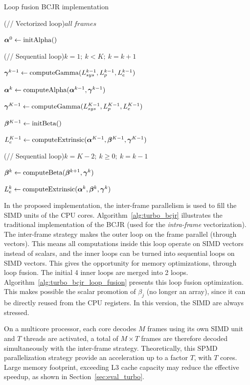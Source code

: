 \begin{algorithm}
  \caption{Loop fusion BCJR implementation}
  \label{alg:turbo_bcjr_loop_fusion}

  \For(// Vectorized loop){$all~frames$}
  {
    $\boldsymbol{\alpha}^0\gets \operatorname*{initAlpha}()$

    \For(// Sequential loop){$k=1;~k<K;~k=k+1$}
    {
      $\boldsymbol{\gamma}^{k-1}\gets \operatorname*{computeGamma}(L_{sys}^{k-1}, L_{p}^{k-1}, L_{e}^{k-1})$

      $\boldsymbol{\alpha}^k\gets \operatorname*{computeAlpha}(\boldsymbol{\alpha}^{k-1}, \boldsymbol{\gamma}^{k-1})$
    }

    $\boldsymbol{\gamma}^{K-1}\gets \operatorname*{computeGamma}(L_{sys}^{K-1}, L_{p}^{K-1}, L_{e}^{K-1})$

    $\boldsymbol{\beta}^{K-1}\gets \operatorname*{initBeta}()$

    $L_e^{K-1}\gets \operatorname*{computeExtrinsic}(\boldsymbol{\alpha}^{K-1}, \boldsymbol{\beta}^{K-1}, \boldsymbol{\gamma}^{K-1})$

    \For(// Sequential loop){$k=K-2;~k \geq 0;~k=k-1$}
    {
      $\boldsymbol{\beta}^k\gets \operatorname*{computeBeta}(\boldsymbol{\beta}^{k+1}, \boldsymbol{\gamma}^{k})$

      $L_e^{k}\gets \operatorname*{computeExtrinsic}(\boldsymbol{\alpha}^{k}, \boldsymbol{\beta}^k, \boldsymbol{\gamma}^{k})$
    }
  }
\end{algorithm}

In the proposed implementation, the inter-frame parallelism is used to fill the
SIMD units of the CPU cores. Algorithm~\ref{alg:turbo_bcjr} illustrates the
traditional implementation of the BCJR (used for the \emph{intra-frame}
vectorization). The inter-frame strategy makes the outer loop on the frame
parallel (through vectors). This means all computations inside this loop operate
on SIMD vectors instead of scalars, and the inner loops can be turned into
sequential loops on SIMD vectors. This gives the opportunity for memory
optimizations, through loop fusion. The initial 4 inner loops are merged into 2
loops. Algorithm~\ref{alg:turbo_bcjr_loop_fusion} presents this loop fusion
optimization. This makes possible the scalar promotion of $\beta_j$ (no longer
an array), since it can be directly reused from the CPU registers. In this
version, the SIMD are always stressed.

On a multicore processor, each core decodes $M$ frames using its own SIMD unit
and $T$ threads are activated, a total of $M\times T$ frames are therefore
decoded simultaneously with the inter-frame strategy. Theoretically, this SPMD
parallelization strategy provide an acceleration up to a factor $T$, with $T$
cores. Large memory footprint, exceeding L3 cache capacity may reduce the
effective speedup, as shown in Section~\ref{sec:eval_turbo}.

